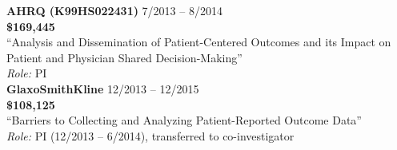 \documentclass[9pt]{article}
\newenvironment{changemargin}[2]{%
  \begin{list}{}{%
    \setlength{\topsep}{0pt}%
    \setlength{\leftmargin}{#1}%
    \setlength{\rightmargin}{#2}%
    \setlength{\listparindent}{\parindent}%
    \setlength{\itemindent}{\parindent}%
    \setlength{\parsep}{\parskip}%
  }%
  \item[]}{\end{list}
}
\newenvironment{body} {
	\vspace*{-16pt}
	\begin{changemargin}{-0.25in}{-0.5in}
  }	
	{\end{changemargin}
}
\begin{document}
\begin{body}
 \textbf{AHRQ (K99HS022431)} \hfill 7/2013 -- 8/2014 \\
 \textbf{\$169,445} \\
 ``Analysis and Dissemination of Patient-Centered Outcomes and its Impact on Patient and Physician Shared Decision-Making'' \\
 \textit{Role:} PI \\


\medskip
 \textbf{GlaxoSmithKline} \hfill 12/2013 -- 12/2015 \\
 \textbf{\$108,125} \\
 ``Barriers to Collecting and Analyzing Patient-Reported Outcome Data'' \\
 \textit{Role:} PI (12/2013 -- 6/2014), transferred to co-investigator \\



\end{body}
\end{document}

